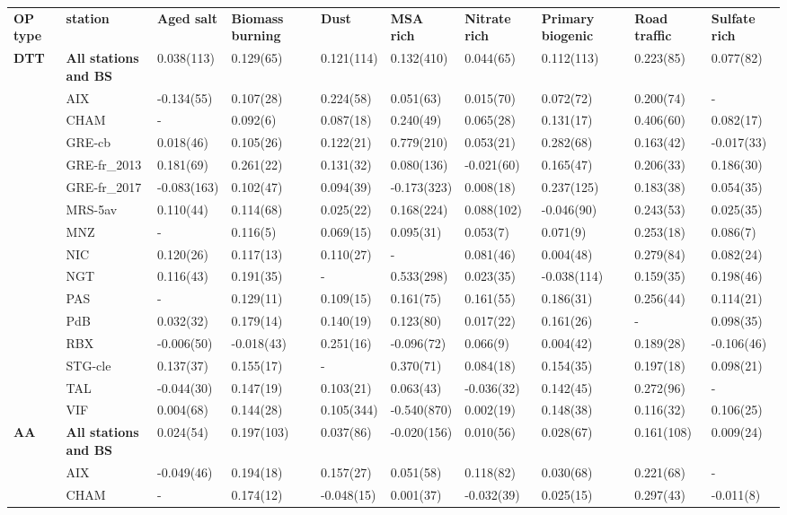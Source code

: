 \documentclass[
]{article}
\begin{document}
\begin{longtable}[]{@{}llllllllll@{}}
\toprule
\endhead
\textbf{OP type} & \textbf{station} & \textbf{Aged salt} &
\textbf{Biomass burning} & \textbf{Dust} & \textbf{MSA rich} &
\textbf{Nitrate rich} & \textbf{Primary biogenic} & \textbf{Road
traffic} & \textbf{Sulfate rich}\tabularnewline
\textbf{DTT} & \textbf{All stations and BS} & 0.038(113) & 0.129(65) &
0.121(114) & 0.132(410) & 0.044(65) & 0.112(113) & 0.223(85) &
0.077(82)\tabularnewline
& AIX & -0.134(55) & 0.107(28) & 0.224(58) & 0.051(63) & 0.015(70) &
0.072(72) & 0.200(74) & -\tabularnewline
& CHAM & - & 0.092(6) & 0.087(18) & 0.240(49) & 0.065(28) & 0.131(17) &
0.406(60) & 0.082(17)\tabularnewline
& GRE-cb & 0.018(46) & 0.105(26) & 0.122(21) & 0.779(210) & 0.053(21) &
0.282(68) & 0.163(42) & -0.017(33)\tabularnewline
& GRE-fr\_2013 & 0.181(69) & 0.261(22) & 0.131(32) & 0.080(136) &
-0.021(60) & 0.165(47) & 0.206(33) & 0.186(30)\tabularnewline
& GRE-fr\_2017 & -0.083(163) & 0.102(47) & 0.094(39) & -0.173(323) &
0.008(18) & 0.237(125) & 0.183(38) & 0.054(35)\tabularnewline
& MRS-5av & 0.110(44) & 0.114(68) & 0.025(22) & 0.168(224) & 0.088(102)
& -0.046(90) & 0.243(53) & 0.025(35)\tabularnewline
& MNZ & - & 0.116(5) & 0.069(15) & 0.095(31) & 0.053(7) & 0.071(9) &
0.253(18) & 0.086(7)\tabularnewline
& NIC & 0.120(26) & 0.117(13) & 0.110(27) & - & 0.081(46) & 0.004(48) &
0.279(84) & 0.082(24)\tabularnewline
& NGT & 0.116(43) & 0.191(35) & - & 0.533(298) & 0.023(35) & -0.038(114)
& 0.159(35) & 0.198(46)\tabularnewline
& PAS & - & 0.129(11) & 0.109(15) & 0.161(75) & 0.161(55) & 0.186(31) &
0.256(44) & 0.114(21)\tabularnewline
& PdB & 0.032(32) & 0.179(14) & 0.140(19) & 0.123(80) & 0.017(22) &
0.161(26) & - & 0.098(35)\tabularnewline
& RBX & -0.006(50) & -0.018(43) & 0.251(16) & -0.096(72) & 0.066(9) &
0.004(42) & 0.189(28) & -0.106(46)\tabularnewline
& STG-cle & 0.137(37) & 0.155(17) & - & 0.370(71) & 0.084(18) &
0.154(35) & 0.197(18) & 0.098(21)\tabularnewline
& TAL & -0.044(30) & 0.147(19) & 0.103(21) & 0.063(43) & -0.036(32) &
0.142(45) & 0.272(96) & -\tabularnewline
& VIF & 0.004(68) & 0.144(28) & 0.105(344) & -0.540(870) & 0.002(19) &
0.148(38) & 0.116(32) & 0.106(25)\tabularnewline
\textbf{AA} & \textbf{All stations and BS} & 0.024(54) & 0.197(103) &
0.037(86) & -0.020(156) & 0.010(56) & 0.028(67) & 0.161(108) &
0.009(24)\tabularnewline
& AIX & -0.049(46) & 0.194(18) & 0.157(27) & 0.051(58) & 0.118(82) &
0.030(68) & 0.221(68) & -\tabularnewline
& CHAM & - & 0.174(12) & -0.048(15) & 0.001(37) & -0.032(39) & 0.025(15)
& 0.297(43) & -0.011(8)\tabularnewline

\end{longtable}
\end{document}
